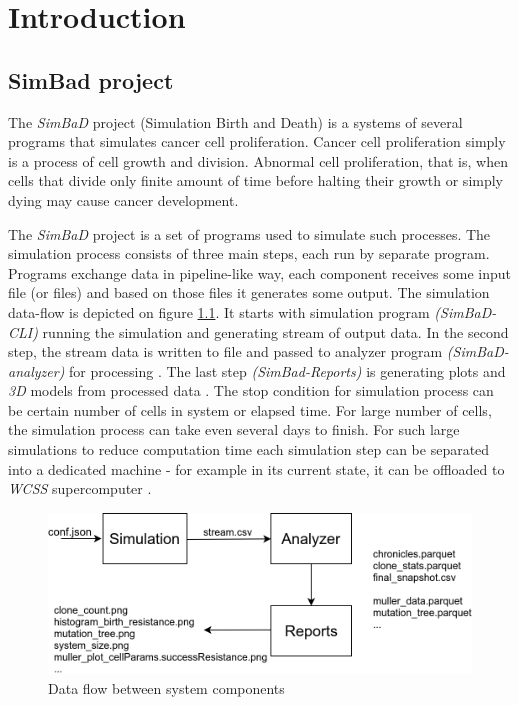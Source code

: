\chapter{Introduction}
\label{chapter:1}
\section{SimBad project}
The \textit{SimBaD} project (Simulation Birth and Death) is a systems of several programs that simulates cancer cell proliferation. Cancer cell proliferation simply is a process of cell growth and division. Abnormal cell proliferation, that is, when  cells that divide only finite amount of time before halting their growth or simply dying  may cause cancer development.

The \textit{SimBaD} project is a set of programs used to simulate such processes. The simulation process consists of three main steps, each run by separate program. Programs exchange data in pipeline-like way, each component receives some input file (or files) and based on those files it generates some output. The simulation data-flow is depicted on figure \ref{fig:data-flow}. It starts with simulation program \textit{(SimBaD-CLI)} \cite{TozanskiCLI} running the simulation and generating stream of output data. In the second step, the stream data is written to file and passed to analyzer program \textit{(SimBaD-analyzer)} for processing \cite{TozanskiAnalyzer}. The last step \textit{(SimBad-Reports)} is generating plots and \textit{3D} models from processed data \cite{TozanskiAnalyzer}.
The stop condition for simulation process can be certain number of cells in system or elapsed time. For large number of cells, the simulation process can take even several days to finish. For such large simulations to reduce computation time each simulation step can be separated into a dedicated machine - for example in its current state, it can be offloaded to \textit{WCSS} supercomputer \cite{TozanskiWCSS}. 
\begin{figure}[h!]
	\centering
		\includegraphics[width=0.9\linewidth]{diagrams/simbad-data-flow.png}
	\caption{Data flow between system components}
	\label{fig:data-flow}
\end{figure}
